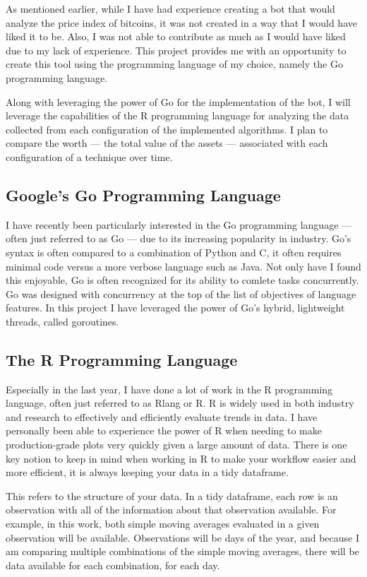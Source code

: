 As mentioned earlier, while I have had experience creating a bot that would analyze the price index
of bitcoins, it was not created in a way that I would have liked it to be. Also, I was not able to
contribute as much as I would have liked due to my lack of experience. This project provides me with
an opportunity to create this tool using the programming language of my choice, namely the Go programming
language.

Along with leveraging the power of Go for the implementation of the bot, I will leverage the capabilities
of the R programming language for analyzing the data collected from each configuration of the implemented
algorithms. I plan to compare the worth --- the total value of the assets --- associated with each
configuration of a technique over time.

\subsection{Google's Go Programming Language}

I have recently been particularly interested in the Go programming language --- often just referred to as Go ---
due to its increasing popularity in industry. Go's syntax is often compared to a combination
of Python and C, it often requires minimal code versus a more verbose language such as Java. Not only
have I found this enjoyable, Go is often recognized for its ability to comlete tasks concurrently.
Go was designed with concurrency at the top of the list of objectives of language features. In this
project I have leveraged the power of Go's hybrid, lightweight threads, called goroutines.

\subsection{The R Programming Language}

Especially in the last year, I have done a lot of work in the R programming language, often just referred
to as Rlang or R. R is widely used in both industry and research to effectively and efficiently evaluate
trends in data. I have personally been able to experience the power of R when needing to make production-grade
plots very quickly given a large amount of data. There is one key notion to keep in mind when working
in R to make your workflow easier and more efficient, it is always keeping your data in a tidy dataframe.

This refers to the structure of your data. In a tidy dataframe, each row is an observation with all
of the information about that observation available. For example, in this work, both simple moving averages
evaluated in a given observation will be available. Observations will be days of the year, and because
I am comparing multiple combinations of the simple moving averages, there will be data available for
each combination, for each day.

